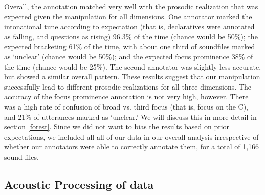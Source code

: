 \documentclass[preprint,review,12pt,authoryear,times]{elsarticle}
\begin{document}
Overall, the annotation matched very well with the prosodic realization that was expected given the manipulation for all dimensions. One annotator marked the intonational tune according to expectation (that is, declaratives were annotated as falling, and questions as rising) 96.3\% of the time (chance would be 50\%); the expected bracketing  61\% of the time, with about one third of soundfiles marked as `unclear' (chance would be 50\%); and the expected focus prominence  38\% of the time (chance would be 25\%). The second annotator was slightly less accurate, but showed a similar overall pattern. These results suggest that our manipulation successfully lead to different prosodic realizations for all three dimensions. The accuracy of the focus prominence annotation is not very high, however. There was a high rate of confusion of broad vs. third focus (that is, focus on the C), and 21\% of utterances marked as `unclear.' We will discuss this in more detail in section \ref{forest}. Since we did not want to bias the results based on prior expectations, we included all all of our data in our overall analysis irrespective of whether our annotators were able to correctly annotate them, for a total of 1,166 sound files. 


\subsection{Acoustic Processing of data}
\end{document}
